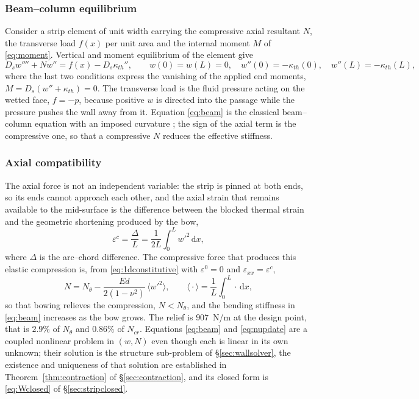 \documentclass[11pt,a4paper]{article}
\newcommand{\eps}{\varepsilon}
\newcommand{\dd}{\mathrm{d}}
\begin{document}
\subsubsection{Beam--column equilibrium}
\label{sec:beameq}

Consider a strip element of unit width carrying the compressive axial
resultant $N$, the transverse load $f(x)$ per unit area and the internal
moment $M$ of \eqref{eq:moment}. Vertical and moment equilibrium of the
element give
\begin{equation}
D_s w''''+N w''=f(x)-D_s\kappa_{th}'',
\qquad
w(0)=w(L)=0,\quad w''(0)=-\kappa_{th}(0),\quad w''(L)=-\kappa_{th}(L),
\label{eq:beam}
\end{equation}
where the last two conditions express the vanishing of the applied end
moments, $M=D_s(w''+\kappa_{th})=0$. The transverse load is the fluid
pressure acting on the wetted face, $f=-p$, because positive $w$ is directed
into the passage while the pressure pushes the wall away from it. Equation
\eqref{eq:beam} is the classical beam--column equation with an imposed
curvature \citep{timoshenko1961stability,boley1960theory}; the sign of the
axial term is the compressive one, so that a compressive $N$ reduces the
effective stiffness.

\subsubsection{Axial compatibility}
\label{sec:compat}

The axial force is not an independent variable: the strip is pinned at both
ends, so its ends cannot approach each other, and the axial strain that
remains available to the mid-surface is the difference between the blocked
thermal strain and the geometric shortening produced by the bow,
\begin{equation}
\eps^{c}=\frac{\Delta}{L}=\frac{1}{2L}\int_0^L w'^2\,\dd x ,
\label{eq:arc}
\end{equation}
where $\Delta$ is the arc--chord difference. The compressive force that
produces this elastic compression is, from \eqref{eq:1dconstitutive} with
$\eps^{0}=0$ and $\eps_{xx}=\eps^{c}$,
\begin{equation}
N=N_\theta-\frac{E d}{2(1-\nu^2)}\,\bigl\langle w'^2\bigr\rangle ,
\qquad
\bigl\langle\cdot\bigr\rangle=\frac1L\int_0^L\cdot\,\dd x ,
\label{eq:nupdate}
\end{equation}
so that bowing relieves the compression, $N<N_\theta$, and the bending
stiffness in \eqref{eq:beam} increases as the bow grows. The relief is
$907$~N/m at the design point, that is $2.9\%$ of $N_\theta$ and $0.86\%$ of
$N_{cr}$. Equations \eqref{eq:beam} and \eqref{eq:nupdate} are a coupled
nonlinear problem in $(w,N)$ even though each is linear in its own unknown;
their solution is the structure sub-problem of \S\ref{sec:wallsolver}, the
existence and uniqueness of that solution are established in
Theorem~\ref{thm:contraction} of \S\ref{sec:contraction}, and its closed form is
\eqref{eq:Wclosed} of \S\ref{sec:stripclosed}.
\end{document}
